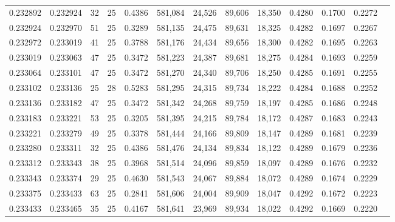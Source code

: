 \begin{tabular}{rrrrrrrrrrrrr}
0.232892 & 0.232924 &    32 &  25 &                                     0.4386 & 581,084 &  24,526 &  89,606 &  18,350 & 0.4280 & 0.1700 & 0.2272 \\
0.232924 & 0.232970 &    51 &  25 &                                     0.3289 & 581,135 &  24,475 &  89,631 &  18,325 & 0.4282 & 0.1697 & 0.2267 \\
0.232972 & 0.233019 &    41 &  25 &                                     0.3788 & 581,176 &  24,434 &  89,656 &  18,300 & 0.4282 & 0.1695 & 0.2263 \\
0.233019 & 0.233063 &    47 &  25 &                                     0.3472 & 581,223 &  24,387 &  89,681 &  18,275 & 0.4284 & 0.1693 & 0.2259 \\
0.233064 & 0.233101 &    47 &  25 &                                     0.3472 & 581,270 &  24,340 &  89,706 &  18,250 & 0.4285 & 0.1691 & 0.2255 \\
0.233102 & 0.233136 &    25 &  28 &                                     0.5283 & 581,295 &  24,315 &  89,734 &  18,222 & 0.4284 & 0.1688 & 0.2252 \\
0.233136 & 0.233182 &    47 &  25 &                                     0.3472 & 581,342 &  24,268 &  89,759 &  18,197 & 0.4285 & 0.1686 & 0.2248 \\
0.233183 & 0.233221 &    53 &  25 &                                     0.3205 & 581,395 &  24,215 &  89,784 &  18,172 & 0.4287 & 0.1683 & 0.2243 \\
0.233221 & 0.233279 &    49 &  25 &                                     0.3378 & 581,444 &  24,166 &  89,809 &  18,147 & 0.4289 & 0.1681 & 0.2239 \\
0.233280 & 0.233311 &    32 &  25 &                                     0.4386 & 581,476 &  24,134 &  89,834 &  18,122 & 0.4289 & 0.1679 & 0.2236 \\
0.233312 & 0.233343 &    38 &  25 &                                     0.3968 & 581,514 &  24,096 &  89,859 &  18,097 & 0.4289 & 0.1676 & 0.2232 \\
0.233343 & 0.233374 &    29 &  25 &                                     0.4630 & 581,543 &  24,067 &  89,884 &  18,072 & 0.4289 & 0.1674 & 0.2229 \\
0.233375 & 0.233433 &    63 &  25 &                                     0.2841 & 581,606 &  24,004 &  89,909 &  18,047 & 0.4292 & 0.1672 & 0.2223 \\
0.233433 & 0.233465 &    35 &  25 &                                     0.4167 & 581,641 &  23,969 &  89,934 &  18,022 & 0.4292 & 0.1669 & 0.2220 \\

\end{tabular}
